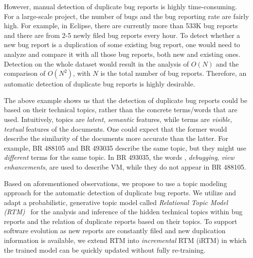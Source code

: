 
However, manual detection of duplicate bug reports is highly
time-consuming. For a large-scale project, the number of bugs and the
bug reporting rate are fairly high. For example, in Eclipse, there are
currently more than 533K bug reports and there are from 2-5 newly
filed bug reports every hour. To detect whether a new bug report is a
duplication of some existing bug report, one would need to analyze and
compare it with all those bug reports, both new and existing
ones. Detection on the whole dataset would result in the analysis of
$O(N)$ and the comparison of $O(N^2)$, with $N$ is the total number of
bug reports. Therefore, an automatic detection of duplicate bug
reports is highly desirable.

The above example shows us that the detection of duplicate bug reports
could be based on their technical topics, rather than the concrete
terms/words that are used. Intuitively, topics are \emph{latent}, {\em
  semantic} features, while terms are \emph{visible, textual} features
of the documents. One could expect that the former would describe the
similarity of the documents more accurate than the latter. For
example, BR 488105 and BR 493035 describe the same topic, but they
might use \emph{different} terms for the same topic. In BR 493035, the
words , {\em debugging}, {\em view enhancements}, are used
to describe VM, while they do not appear in BR 488105.



Based on aforementioned observations, we propose to use a topic
modeling approach for the automatic detection of duplicate bug
reports. We utilize and adapt a probabilistic, generative topic model
called {\em Relational Topic Model (RTM)}~\cite{RTM} for the analysis
and inference of the hidden technical topics within bug reports and
the relation of duplicate reports based on their topics. To support
software evolution as new reports are constantly filed and new
duplication information is available, we extend RTM into {\em
incremental} RTM (iRTM) in which the trained model can be quickly
updated without fully re-training.


